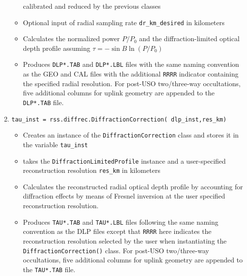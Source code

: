 \documentclass[titlepage, 12pt]{article}
\begin{document}
\begin{enumerate}
\begin{itemize}
                                calibrated and reduced by the previous classes 
                          \item Optional input of radial sampling rate
                                \texttt{dr\_km\_desired} in kilometers
                          \item Calculates the normalized power $P/P_0$
                                and the diffraction-limited
                                optical depth profile assuming
                                $\tau=-\sin B\ln (P/P_0)$ 
                          \item Produces \texttt{DLP*.TAB} and
                                \texttt{DLP*.LBL} files with the same
                                naming convention as the GEO and CAL files
                                with the additional \texttt{RRRR} indicator containing the specified radial resolution.
                                For post-USO two/three-way occultations, five additional columns for uplink geometry are appended to the \texttt{DLP*.TAB} file. 
                      \end{itemize}
                \item \small{\texttt{tau\_inst =
                                     rss.diffrec.DiffractionCorrection(
                                     dlp\_inst,res\_km)}}
                      \normalsize
                      \begin{itemize}
                          \item Creates an instance of the
                                \texttt{DiffractionCorrection} class and
                                stores it in the variable \texttt{tau\_inst} 
                          \item takes the \texttt{DiffractionLimitedProfile}
                                instance and a user-specified reconstruction
                                resolution \texttt{res\_km} in kilometers
                          \item Calculates the reconstructed radial optical depth profile 
                                by accounting for diffraction
                                effects by means of Fresnel inversion at the
                                user specified reconstruction resolution.
                          \item Produces \texttt{TAU*.TAB} and
                                \texttt{TAU*.LBL} files following the same
                                naming convention as the DLP files except
                                that \texttt{RRRR} here indicates the
                                reconstruction resolution selected by
                                the user when instantiating the
                                \texttt{DiffractionCorrection()} class. For post-USO two/three-way occultations, five additional columns for uplink geometry are appended to the \texttt{TAU*.TAB} file. 
                      \end{itemize}
            \end{enumerate}
\end{document}
